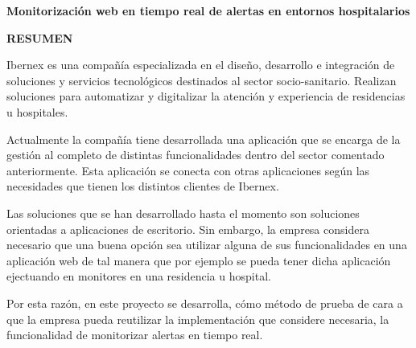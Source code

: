 \begin{center}
{\Large \bfseries Monitorización web en tiempo real de alertas en entornos hospitalarios}

\vspace{1cm}
{\Large \bfseries RESUMEN}

\end{center}


Ibernex es una compañía especializada en el diseño, desarrollo e integración de soluciones y servicios tecnológicos destinados al sector socio-sanitario.
Realizan soluciones para automatizar y digitalizar la atención y experiencia de residencias u hospitales. \newline

Actualmente la compañía tiene desarrollada una aplicación que se encarga de la gestión al completo de distintas funcionalidades dentro del sector comentado anteriormente. Esta aplicación se conecta con otras aplicaciones según las necesidades que tienen los distintos clientes de Ibernex. \newline

Las soluciones que se han desarrollado hasta el momento son soluciones orientadas a aplicaciones de escritorio. Sin embargo, la empresa considera necesario que una buena opción sea utilizar alguna de sus funcionalidades en una aplicación web de tal manera que por ejemplo se pueda tener dicha aplicación ejectuando en monitores en una residencia u hospital. \newline

Por esta razón, en este proyecto se desarrolla, cómo método de prueba de cara a que la empresa pueda reutilizar la implementación que considere necesaria, la funcionalidad de monitorizar alertas en tiempo real.

